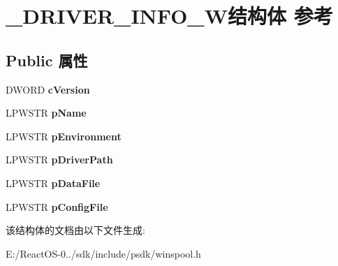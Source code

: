 \hypertarget{struct___d_r_i_v_e_r___i_n_f_o__2_w}{}\section{\+\_\+\+D\+R\+I\+V\+E\+R\+\_\+\+I\+N\+F\+O\+\_\+W结构体 参考}
\label{struct___d_r_i_v_e_r___i_n_f_o__2_w}
\subsection*{Public 属性}
\begin{DoxyCompactItemize}
\item 
\mbox{\label{struct___d_r_i_v_e_r___i_n_f_o__2_w_a15d6d957a023801e2f02d0f824293dda}} 
D\+W\+O\+RD {\bfseries c\+Version}
\item 
\mbox{\label{struct___d_r_i_v_e_r___i_n_f_o__2_w_aa0b39dc990aad89694c79dc8f5e6df57}} 
L\+P\+W\+S\+TR {\bfseries p\+Name}
\item 
\mbox{\label{struct___d_r_i_v_e_r___i_n_f_o__2_w_a773f609c9574d150dd3b32e95f39f6ac}} 
L\+P\+W\+S\+TR {\bfseries p\+Environment}
\item 
\mbox{\label{struct___d_r_i_v_e_r___i_n_f_o__2_w_a274769a7ecfb867930273baaa9cae1ae}} 
L\+P\+W\+S\+TR {\bfseries p\+Driver\+Path}
\item 
\mbox{\label{struct___d_r_i_v_e_r___i_n_f_o__2_w_a76d7a1131a8abceeae23b0061f6a2ebf}} 
L\+P\+W\+S\+TR {\bfseries p\+Data\+File}
\item 
\mbox{\label{struct___d_r_i_v_e_r___i_n_f_o__2_w_ab4f1f0f7fddc87d545e389477eda3ab5}} 
L\+P\+W\+S\+TR {\bfseries p\+Config\+File}
\end{DoxyCompactItemize}


该结构体的文档由以下文件生成\+:\begin{DoxyCompactItemize}
\item 
E\+:/\+React\+O\+S-\/0../sdk/include/psdk/winspool.\+h\end{DoxyCompactItemize}

